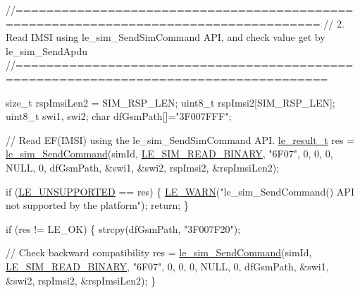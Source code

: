 \begin{DoxyCodeInclude}
    \textcolor{comment}{//=====================================================================================}
    \textcolor{comment}{// 2. Read IMSI using le\_sim\_SendSimCommand API, and check value get by le\_sim\_SendApdu}
    \textcolor{comment}{//======================================================================================}

    \textcolor{keywordtype}{size\_t} rspImsiLen2 = SIM\_RSP\_LEN;
    uint8\_t rspImsi2[SIM\_RSP\_LEN];
    uint8\_t swi1, swi2;
    \textcolor{keywordtype}{char} dfGsmPath[]=\textcolor{stringliteral}{"3F007FFF"};

    \textcolor{comment}{// Read EF(IMSI) using the le\_sim\_SendSimCommand API.}
    \hyperlink{le__basics_8h_a1cca095ed6ebab24b57a636382a6c86c}{le\_result\_t} res = \hyperlink{le__sim__interface_8h_a8bbaea044b44f8b0ebff67bf98de816a}{le\_sim\_SendCommand}(simId,
                                         \hyperlink{le__sim__interface_8h_ac1a708ba305c36e33383073ec7f0e331ae4a619ba58f2cd503103b397b717b16f}{LE\_SIM\_READ\_BINARY},
                                         \textcolor{stringliteral}{"6F07"},
                                         0,
                                         0,
                                         0,
                                         NULL,
                                         0,
                                         dfGsmPath,
                                         &swi1,
                                         &swi2,
                                         rspImsi2,
                                         &rspImsiLen2);

    \textcolor{keywordflow}{if} (\hyperlink{le__basics_8h_a1cca095ed6ebab24b57a636382a6c86ca5377262702e8434207b03533259e0c5f}{LE\_UNSUPPORTED} == res)
    \{
        \hyperlink{le__log_8h_a0201b2f60ee0e945479f91e181bf04b6}{LE\_WARN}(\textcolor{stringliteral}{"le\_sim\_SendCommand() API not supported by the platform"});
        \textcolor{keywordflow}{return};
    \}

    \textcolor{keywordflow}{if} (res != LE\_OK)
    \{
        strcpy(dfGsmPath, \textcolor{stringliteral}{"3F007F20"});

        \textcolor{comment}{// Check backward compatibility}
        res = \hyperlink{le__sim__interface_8h_a8bbaea044b44f8b0ebff67bf98de816a}{le\_sim\_SendCommand}(simId,
                                 \hyperlink{le__sim__interface_8h_ac1a708ba305c36e33383073ec7f0e331ae4a619ba58f2cd503103b397b717b16f}{LE\_SIM\_READ\_BINARY},
                                 \textcolor{stringliteral}{"6F07"},
                                 0,
                                 0,
                                 0,
                                 NULL,
                                 0,
                                 dfGsmPath,
                                 &swi1,
                                 &swi2,
                                 rspImsi2,
                                 &rspImsiLen2);
    \}


\end{DoxyCodeInclude}
